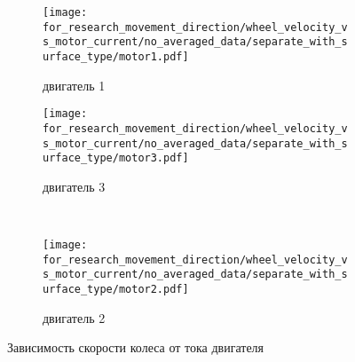 \begin{figure}[H]
    \centering
    \begin{subfigure}{0.45\textwidth}
        \centering
        \texttt{[image: for\_research\_movement\_direction/wheel\_velocity\_vs\_motor\_current/no\_averaged\_data/separate\_with\_surface\_type/motor1.pdf]}
        \caption{двигатель 1}
    \end{subfigure}
    \hspace{0.005\textwidth}
    \begin{subfigure}{0.45\textwidth}
        \centering
        \texttt{[image: for\_research\_movement\_direction/wheel\_velocity\_vs\_motor\_current/no\_averaged\_data/separate\_with\_surface\_type/motor3.pdf]}
        \caption{двигатель 3}
    \end{subfigure} \\
    \vspace{4pt}
    \centering
    \begin{subfigure}{0.45\textwidth}
        \centering
        \texttt{[image: for\_research\_movement\_direction/wheel\_velocity\_vs\_motor\_current/no\_averaged\_data/separate\_with\_surface\_type/motor2.pdf]}
        \caption{двигатель 2}
    \end{subfigure}
    \caption{Зависимость скорости колеса от тока двигателя}
\end{figure}